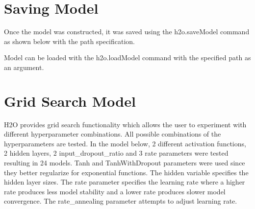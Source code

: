 \documentclass[12pt,twoside]{amherstthesis}
\begin{document}
  \clearpage 
  
  \section{Saving Model}\label{saving-model}
  
  Once the model was constructed, it was saved using the h2o.saveModel
  command as shown below with the path specification.
  
  \begin{Shaded}
  \begin{Highlighting}[]
  \StringTok{ } \NormalTok{, } \NormalTok{) }
  \end{Highlighting}
  \end{Shaded}
  
  Model can be loaded with the h2o.loadModel command with the specified
  path as an argument.
  
  \begin{Shaded}
  \begin{Highlighting}[]
  \StringTok{ }\NormalTok{(}
  \NormalTok{)}
  \end{Highlighting}
  \end{Shaded}
  
  \section{Grid Search Model}\label{grid-search-model}
  
  H2O provides grid search functionality which allows the user to
  experiment with different hyperparameter combinations. All possible
  combinations of the hyperparameters are tested. In the model below, 2
  different activation functions, 2 hidden layers, 2 input\_dropout\_ratio
  and 3 rate parameters were tested resulting in 24 models. Tanh and
  TanhWithDropout parameters were used since they better regularize for
  exponential functions. The hidden variable specifies the hidden layer
  sizes. The rate parameter specifies the learning rate where a higher
  rate produces less model stability and a lower rate produces slower
  model convergence. The rate\_annealing parameter attempts to adjust
  learning rate.
  
\end{document}
